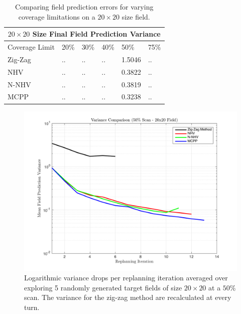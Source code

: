 \begin{table}[ht!]
\centering
	\begin{tabular}{ |p{3cm}||p{1cm}|p{1cm}|p{1cm}|p{1cm}|p{1cm}|  }
		\hline
		\multicolumn{6}{|c|}{$20 \times 20$ Size Final Field Prediction Variance} \\
		\hline
		Coverage Limit & 20\% & 30\% & 40\% & 50\% & 75\% \\
		\hline
		Zig-Zag        & .. & .. & .. & 1.5046 & .. \\
		NHV            & .. & .. & .. & 0.3822 & .. \\
		N-NHV          & .. & .. & .. & 0.3819 & .. \\
		MCPP           & .. & .. & .. & 0.3238 & .. \\
		\hline
	\end{tabular}
	\caption{Comparing field prediction errors for varying coverage limitations on a $20 \times 20$ size field.}
    \label{tab:20fieldvar}
\end{table}

\begin{figure}[hb!]
	\centering
	\includegraphics[width=0.8\linewidth]{figures/vars_semilogy_20x20_50percent_5runs.png}
    \captionsetup{skip=0.20\baselineskip,size=footnotesize}
	\caption{Logarithmic variance drops per replanning iteration averaged over exploring 5 randomly generated target fields of size $20 \times 20$ at a $50\%$ scan. The variance for the zig-zag method are recalculated at every turn.}
\end{figure}


